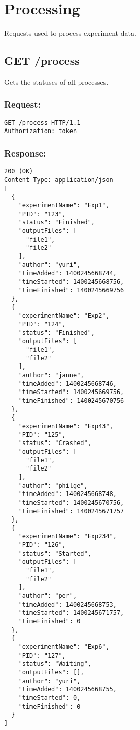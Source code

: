 \section*{Processing}

Requests used to process experiment data.

\subsection*{GET /process}

Gets the statuses of all processes.

\subsubsection*{Request:}
\begin{verbatim}
GET /process HTTP/1.1
Authorization: token
\end{verbatim}

\subsubsection*{Response:}
\begin{verbatim}
200 (OK)
Content-Type: application/json
[
  {
    "experimentName": "Exp1",
    "PID": "123",
    "status": "Finished",
    "outputFiles": [
      "file1",
      "file2"
    ],
    "author": "yuri",
    "timeAdded": 1400245668744,
    "timeStarted": 1400245668756,
    "timeFinished": 1400245669756
  },
  {
    "experimentName": "Exp2",
    "PID": "124",
    "status": "Finished",
    "outputFiles": [
      "file1",
      "file2"
    ],
    "author": "janne",
    "timeAdded": 1400245668746,
    "timeStarted": 1400245669756,
    "timeFinished": 1400245670756
  },
  {
    "experimentName": "Exp43",
    "PID": "125",
    "status": "Crashed",
    "outputFiles": [
      "file1",
      "file2"
    ],
    "author": "philge",
    "timeAdded": 1400245668748,
    "timeStarted": 1400245670756,
    "timeFinished": 1400245671757
  },
  {
    "experimentName": "Exp234",
    "PID": "126",
    "status": "Started",
    "outputFiles": [
      "file1",
      "file2"
    ],
    "author": "per",
    "timeAdded": 1400245668753,
    "timeStarted": 1400245671757,
    "timeFinished": 0
  },
  {
    "experimentName": "Exp6",
    "PID": "127",
    "status": "Waiting",
    "outputFiles": [],
    "author": "yuri",
    "timeAdded": 1400245668755,
    "timeStarted": 0,
    "timeFinished": 0
  }
]
\end{verbatim}

